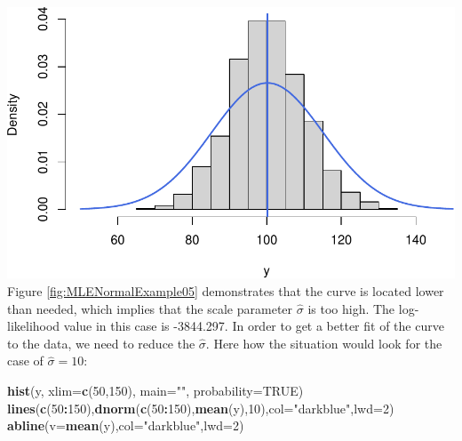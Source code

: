 \documentclass[
]{book}
\newenvironment{Shaded}{\begin{snugshade}}{\end{snugshade}}
\newcommand{\DataTypeTok}[1]{\textcolor[rgb]{0.13,0.29,0.53}{#1}}
\newcommand{\DecValTok}[1]{\textcolor[rgb]{0.00,0.00,0.81}{#1}}
\newcommand{\KeywordTok}[1]{\textcolor[rgb]{0.13,0.29,0.53}{\textbf{#1}}}
\newcommand{\NormalTok}[1]{#1}
\newcommand{\OperatorTok}[1]{\textcolor[rgb]{0.81,0.36,0.00}{\textbf{#1}}}
\newcommand{\OtherTok}[1]{\textcolor[rgb]{0.56,0.35,0.01}{#1}}
\newcommand{\StringTok}[1]{\textcolor[rgb]{0.31,0.60,0.02}{#1}}
\theoremstyle{definition}
\theoremstyle{definition}
\theoremstyle{definition}
\theoremstyle{definition}
\theoremstyle{remark}
\begin{document}
\includegraphics{Svetunkov---Statistics-for-Business-Analytics_files/figure-latex/MLENormalExample05-1.pdf}
Figure \ref{fig:MLENormalExample05} demonstrates that the curve is located lower than needed, which implies that the scale parameter \(\hat{\sigma}\) is too high. The log-likelihood value in this case is -3844.297. In order to get a better fit of the curve to the data, we need to reduce the \(\hat{\sigma}\). Here how the situation would look for the case of \(\hat{\sigma}=10\):

\begin{Shaded}
\begin{Highlighting}[]
\KeywordTok{hist}\NormalTok{(y, }\DataTypeTok{xlim=}\KeywordTok{c}\NormalTok{(}\DecValTok{50}\NormalTok{,}\DecValTok{150}\NormalTok{), }\DataTypeTok{main=}\StringTok{""}\NormalTok{, }\DataTypeTok{probability=}\OtherTok{TRUE}\NormalTok{)}
\KeywordTok{lines}\NormalTok{(}\KeywordTok{c}\NormalTok{(}\DecValTok{50}\OperatorTok{:}\DecValTok{150}\NormalTok{),}\KeywordTok{dnorm}\NormalTok{(}\KeywordTok{c}\NormalTok{(}\DecValTok{50}\OperatorTok{:}\DecValTok{150}\NormalTok{),}\KeywordTok{mean}\NormalTok{(y),}\DecValTok{10}\NormalTok{),}\DataTypeTok{col=}\StringTok{"darkblue"}\NormalTok{,}\DataTypeTok{lwd=}\DecValTok{2}\NormalTok{)}
\KeywordTok{abline}\NormalTok{(}\DataTypeTok{v=}\KeywordTok{mean}\NormalTok{(y),}\DataTypeTok{col=}\StringTok{"darkblue"}\NormalTok{,}\DataTypeTok{lwd=}\DecValTok{2}\NormalTok{)}
\end{Highlighting}
\end{Shaded}
\end{document}
